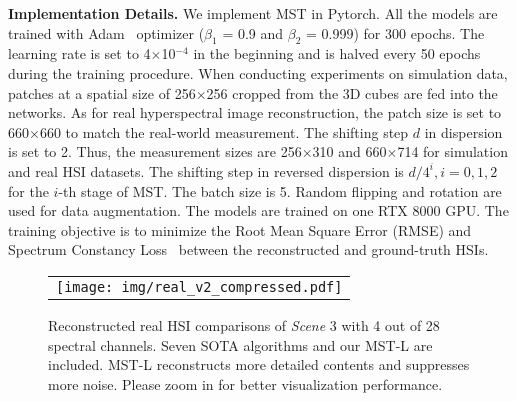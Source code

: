 \documentclass[10pt,twocolumn,letterpaper]{article}
\begin{document}
\noindent \textbf{Implementation Details.} We implement MST in Pytorch. All the models are trained with Adam~\cite{adam} optimizer ($\beta_1$ = 0.9 and $\beta_2$ = 0.999) for 300 epochs. The learning rate is set to 4$\times$10$^{-4}$ in the beginning and is halved every 50 epochs during the training procedure. When conducting experiments on simulation data, patches at a spatial size of 256$\times$256 cropped from the 3D cubes are fed into the networks. As for real hyperspectral image reconstruction, the patch size is set to 660$\times$660 to match the real-world measurement. The shifting step $d$ in dispersion is set to 2. Thus, the measurement sizes are 256$\times$310 and 660$\times$714 for simulation and real HSI datasets. The shifting step in reversed dispersion is ${d}/{4^i}, i = 0,1,2$ for the $i$-th stage of MST. The batch size is 5. Random flipping and rotation are used for data augmentation. The models are trained on one RTX 8000 GPU. The training objective is to minimize the Root Mean Square Error (RMSE) and Spectrum Constancy Loss~\cite{Zhao_2019_CVPR} between the reconstructed and ground-truth HSIs.
\begin{figure*}[t]
	\begin{center}
		\begin{tabular}[t]{c} \hspace{-2.7mm} \texttt{[image: img/real\_v2\_compressed.pdf]}
		\end{tabular}
	\end{center}
	\vspace*{-7mm}
	\caption{\small Reconstructed real HSI comparisons of  \emph{Scene} 3 with 4 out of 28 spectral channels. Seven SOTA algorithms and our MST-L are included. MST-L reconstructs more detailed contents and suppresses more noise. Please zoom in for better visualization performance. }
	\label{fig:real}
	\vspace{-5mm}
\end{figure*}

\vspace{-4.5mm}
\end{document}
